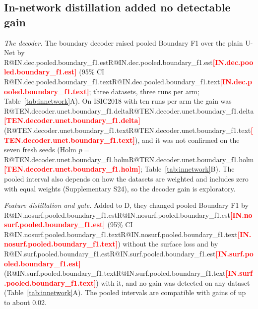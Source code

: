 \documentclass[fleqn,10pt,lineno]{wlpeerj}
\makeatletter
\newcommand{\R}[1]{\ifcsname R@#1\endcsname\csname R@#1\endcsname\else\textbf{\textcolor{red}{[#1]}}\fi}
\makeatother
\begin{document}
\begin{table}[!tb]
\centering
{\small}
\caption{\label{tab:matched}Matched-protocol scores, three runs per arm (seeds 1--3). Upper rows of each dataset: arms of this study, with the reference arm D shaded; lower rows: reference methods. Run means average class-macro scores over test images (ISIC2018) or slices (ACDC, Synapse), excluding classes absent from both prediction and reference. The contrasts of Table~\ref{tab:innetwork}A average within patients or cases first, so they can differ from differences between rows here (Synapse, D${}-{}$U: \R{T45.synapse.rows} here, \R{T45.synapse.contrast} there). Other metrics, ablation cells and the adapted LB-UNet: Supplementary S6--S7.}
\end{table}

\subsection*{In-network distillation added no detectable gain}
\emph{The decoder.} The boundary decoder raised pooled Boundary F1 over the plain U-Net by \R{IN.dec.pooled.boundary_f1.est} (95\% CI \R{IN.dec.pooled.boundary_f1.text}; three datasets, three runs per arm; Table~\ref{tab:innetwork}A). On ISIC2018 with ten runs per arm the gain was \R{TEN.decoder.unet.boundary_f1.delta} (\R{TEN.decoder.unet.boundary_f1.text}), and it was not confirmed on the seven fresh seeds (Holm $p=$\,\R{TEN.decoder.unet.boundary_f1.holm}; Table~\ref{tab:innetwork}B). The pooled interval also depends on how the datasets are weighted and includes zero with equal weights (Supplementary S24), so the decoder gain is exploratory.

\emph{Feature distillation and gate.} Added to D, they changed pooled Boundary F1 by \R{IN.nosurf.pooled.boundary_f1.est} (95\% CI \R{IN.nosurf.pooled.boundary_f1.text}) without the surface loss and by \R{IN.surf.pooled.boundary_f1.est} (\R{IN.surf.pooled.boundary_f1.text}) with it, and no gain was detected on any dataset (Table~\ref{tab:innetwork}A). The pooled intervals are compatible with gains of up to about 0.02.
\end{document}
